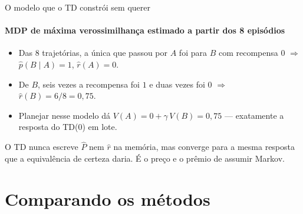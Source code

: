 \documentclass[aspectratio=169, 11pt]{beamer}
\begin{document}
\begin{frame}{O modelo que o TD constrói sem querer}
  \framesubtitle{MDP de máxima verossimilhança estimado a partir dos 8 episódios}
  \centering

  \smallskip
  \raggedright
  \begin{itemize}\setlength{\itemsep}{0.2ex}
    \item Das 8 trajetórias, a única que passou por $A$ foi para $B$
      com recompensa $0$ $\Rightarrow$ $\hat p(B \mid A) = 1$, $\hat r(A) = 0$.
    \item De $B$, seis vezes a recompensa foi $1$ e duas vezes foi $0$
      $\Rightarrow$ $\hat r(B) = 6/8 = 0{,}75$.
    \item Planejar nesse modelo dá $V(A) = 0 + \gamma\,V(B) = 0{,}75$ —
      \alert{exatamente a resposta do TD(0) em lote}.
  \end{itemize}

  \begin{ideiabox}
    O TD nunca escreve $\hat P$ nem $\hat r$ na memória, mas converge para
    a mesma resposta que a equivalência de certeza daria. É o preço e o
    prêmio de assumir Markov.
  \end{ideiabox}
\end{frame}

\section{Comparando os métodos}
\end{document}
